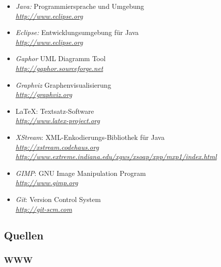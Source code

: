 \documentclass[a4paper,titlepage]{article}
\begin{document}
\begin{itemize}
\item \emph{Java:} Programmiersprache und Umgebung \\
	\emph{\href{http://www.eclipse.org}{http://www.eclipse.org}}
	\item \emph{Eclipse:} Entwicklungsumgebung für Java \\
		\emph{\href{http://www.eclipse.org}{http://www.eclipse.org}}
\item \emph{Gaphor} UML Diagramm Tool \\
	\emph{\href{http://gaphor.sourceforge.net}{http://gaphor.sourceforge.net}}
\item \emph{Graphviz} Graphenvisualisierung \\
	\emph{\href{http://graphviz.org}{http://graphviz.org}}
\item \LaTeX: Textsatz-Software \\
	\emph{\href{http://www.latex-project.org}{http://www.latex-project.org}}
\item \emph{XStream}: XML-Enkodierungs-Bibliothek für Java \\
	\emph{\href{http://xstream.codehaus.org}{http://xstream.codehaus.org}} \\
	\emph{\href{http://www.extreme.indiana.edu/xgws/xsoap/xpp/mxp1/index.html}{http://www.extreme.indiana.edu/xgws/xsoap/xpp/mxp1/index.html}}
\item \emph{GIMP}: GNU Image Manipulation Program \\
	\emph{\href{http://www.gimp.org}{http://www.gimp.org}}
\item \emph{Git}: Version Control System \\
	\emph{\href{http://git-scm.com}{http://git-scm.com}}
\end{itemize}

\subsection{Quellen}

\subsubsection{WWW}
\end{document}
